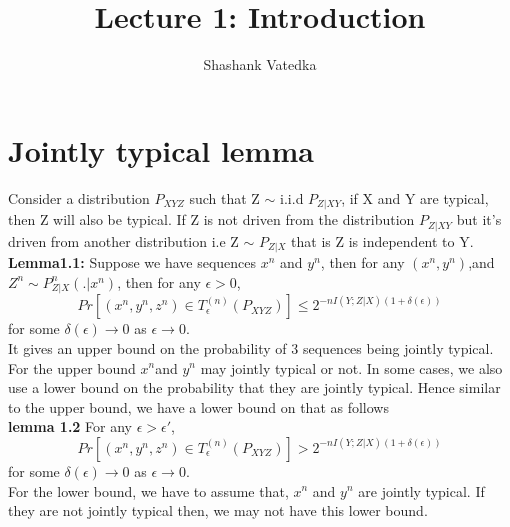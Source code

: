 \documentclass{article}
\title{Lecture 1: Introduction}
\author{Shashank Vatedka}
\begin{document}
	
	
	
	\section{Jointly typical lemma}

Consider a distribution $P_{XYZ}$ such that Z $\sim$  i.i.d $P_{Z|XY}$, if X and Y are typical, then Z will also be typical. If Z is not driven from the distribution $P_{Z|XY}$ but it's driven from another distribution i.e Z $\sim$ $P_{Z|X}$ that is Z is independent to Y.\\
\textbf{Lemma1.1:} Suppose we have sequences $x^{n}$ and $y^{n}$, then for any $\left( x^n, y^n \right)$,and $Z^n \sim P^{n}_{Z|X}\left( .|x^n\right)$,  then for any $\epsilon >0$,
\begin{equation}
	Pr \left[ \left(x^n, y^n,z^n \right) \in T^{(n)}_{\epsilon}  \left( P_{XYZ}\right)\right] \leq 2^{-nI\left( Y; Z|X\right) \left(1 + \delta(\epsilon)\right)} 
\end{equation}
for some $\delta(\epsilon) \rightarrow 0$ as $\epsilon \rightarrow 0$.\\
It gives an upper bound on the probability of 3 sequences being jointly typical. For the upper bound  $ x^n$and $ y^n$ may jointly typical or not. In some cases, we also use a lower bound on the probability that they are jointly typical. Hence similar to the upper bound, we have a lower bound on that as follows\\
\textbf{lemma 1.2} For any $\epsilon > \epsilon'$,
\begin{equation}
	Pr \left[ \left(x^n, y^n,z^n \right) \in T^{(n)}_{\epsilon}  \left( P_{XYZ}\right)\right] > 2^{-nI\left( Y;Z|X\right) \left(1 + \delta(\epsilon)\right)} 
\end{equation}
for some $\delta(\epsilon) \rightarrow 0$ as $\epsilon \rightarrow 0$.\\ For the lower bound, we have to assume that, $x^n$ and $y^n$ are jointly typical. If they are not jointly typical then, we may not have this lower bound.
\end{document}
